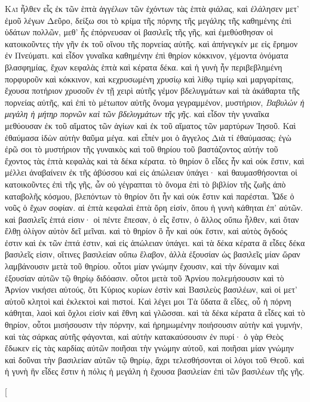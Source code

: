 \begin{pages}
    \begin{Rightside}
        \beginnumbering
		\renewcommand{\LettrineFontHook}{\PHtitl}
		\lettrine[lines=3]{Κ}{αὶ} ἦλθεν εἷς ἐκ τῶν ἑπτὰ ἀγγέλων τῶν ἐχόντων τὰς ἑπτὰ φιάλας, καὶ ἐλάλησεν μετ’ ἐμοῦ λέγων Δεῦρο, δείξω σοι τὸ κρίμα τῆς πόρνης τῆς μεγάλης τῆς καθημένης ἐπὶ ὑδάτων πολλῶν, μεθ’ ἧς ἐπόρνευσαν οἱ βασιλεῖς τῆς γῆς, καὶ ἐμεθύσθησαν οἱ κατοικοῦντες τὴν γῆν ἐκ τοῦ οἴνου τῆς πορνείας αὐτῆς. 
		\pend
		\pstart
		καὶ ἀπήνεγκέν με εἰς ἔρημον ἐν Πνεύματι. καὶ εἶδον γυναῖκα καθημένην ἐπὶ θηρίον κόκκινον, γέμοντα ὀνόματα βλασφημίας, ἔχων κεφαλὰς ἑπτὰ καὶ κέρατα δέκα. καὶ ἡ γυνὴ ἦν περιβεβλημένη πορφυροῦν καὶ κόκκινον, καὶ κεχρυσωμένη χρυσίῳ καὶ λίθῳ τιμίῳ καὶ μαργαρίταις, ἔχουσα ποτήριον χρυσοῦν ἐν τῇ χειρὶ αὐτῆς γέμον βδελυγμάτων καὶ τὰ ἀκάθαρτα τῆς πορνείας αὐτῆς, καὶ ἐπὶ τὸ μέτωπον αὐτῆς ὄνομα γεγραμμένον, μυστήριον, \textit{Βαβυλών  ἡ μεγάλη ἡ μήτηρ πορνῶν καὶ τῶν βδελυγμάτων τῆς γῆς}.
		\pend
		\pstart
		καὶ εἶδον τὴν γυναῖκα μεθύουσαν ἐκ τοῦ αἵματος τῶν ἁγίων καὶ ἐκ τοῦ αἵματος τῶν μαρτύρων Ἰησοῦ. Καὶ ἐθαύμασα ἰδὼν αὐτὴν θαῦμα μέγα. καὶ εἶπέν μοι ὁ ἄγγελος Διὰ τί ἐθαύμασας; ἐγὼ ἐρῶ σοι τὸ μυστήριον τῆς γυναικὸς καὶ τοῦ θηρίου τοῦ βαστάζοντος αὐτήν τοῦ ἔχοντος τὰς ἑπτὰ κεφαλὰς καὶ τὰ δέκα κέρατα. τὸ θηρίον ὃ εἶδες ἦν καὶ οὐκ ἔστιν, καὶ μέλλει ἀναβαίνειν ἐκ τῆς ἀβύσσου καὶ εἰς ἀπώλειαν ὑπάγει· καὶ θαυμασθήσονται οἱ κατοικοῦντες ἐπὶ τῆς γῆς, ὧν οὐ γέγραπται τὸ ὄνομα ἐπὶ τὸ βιβλίον τῆς ζωῆς ἀπὸ καταβολῆς κόσμου, βλεπόντων τὸ θηρίον ὅτι ἦν καὶ οὐκ ἔστιν καὶ παρέσται. 
		\pend
		\pstart
		Ὧδε ὁ νοῦς ὁ ἔχων σοφίαν. αἱ ἑπτὰ κεφαλαὶ ἑπτὰ ὄρη εἰσίν, ὅπου ἡ γυνὴ κάθηται ἐπ’ αὐτῶν. καὶ βασιλεῖς ἑπτά εἰσιν· οἱ πέντε ἔπεσαν, ὁ εἷς ἔστιν, ὁ ἄλλος οὔπω ἦλθεν, καὶ ὅταν ἔλθῃ ὀλίγον αὐτὸν δεῖ μεῖναι.
		\pend 
		\pstart
		καὶ τὸ θηρίον ὃ ἦν καὶ οὐκ ἔστιν, καὶ αὐτὸς ὄγδοός ἐστιν καὶ ἐκ τῶν ἑπτά ἐστιν, καὶ εἰς ἀπώλειαν ὑπάγει. καὶ τὰ δέκα κέρατα ἃ εἶδες δέκα βασιλεῖς εἰσιν, οἵτινες βασιλείαν οὔπω ἔλαβον, ἀλλὰ ἐξουσίαν ὡς βασιλεῖς μίαν ὥραν λαμβάνουσιν μετὰ τοῦ θηρίου. οὗτοι μίαν γνώμην ἔχουσιν, καὶ τὴν δύναμιν καὶ ἐξουσίαν αὐτῶν τῷ θηρίῳ διδόασιν. οὗτοι μετὰ τοῦ Ἀρνίου πολεμήσουσιν καὶ τὸ Ἀρνίον νικήσει αὐτούς, ὅτι Κύριος κυρίων ἐστὶν καὶ Βασιλεὺς βασιλέων, καὶ οἱ μετ’ αὐτοῦ κλητοὶ καὶ ἐκλεκτοὶ καὶ πιστοί.
		\pend
		\pstart
		Καὶ λέγει μοι Τὰ ὕδατα ἃ εἶδες, οὗ ἡ πόρνη κάθηται, λαοὶ καὶ ὄχλοι εἰσὶν καὶ ἔθνη καὶ γλῶσσαι. καὶ τὰ δέκα κέρατα ἃ εἶδες καὶ τὸ θηρίον, οὗτοι μισήσουσιν τὴν πόρνην, καὶ ἠρημωμένην ποιήσουσιν αὐτὴν καὶ γυμνήν, καὶ τὰς σάρκας αὐτῆς φάγονται, καὶ αὐτὴν κατακαύσουσιν ἐν πυρί· ὁ γὰρ Θεὸς ἔδωκεν εἰς τὰς καρδίας αὐτῶν ποιῆσαι τὴν γνώμην αὐτοῦ, καὶ ποιῆσαι μίαν γνώμην καὶ δοῦναι τὴν βασιλείαν αὐτῶν τῷ θηρίῳ, ἄχρι τελεσθήσονται οἱ λόγοι τοῦ Θεοῦ. καὶ ἡ γυνὴ ἣν εἶδες ἔστιν ἡ πόλις ἡ μεγάλη ἡ ἔχουσα βασιλείαν ἐπὶ τῶν βασιλέων τῆς γῆς.
		\pend
        \endnumbering
    \end{Rightside}
    \begin{Leftside}
        \beginnumbering
        \pstart[

\end{Leftside}
\end{pages}

